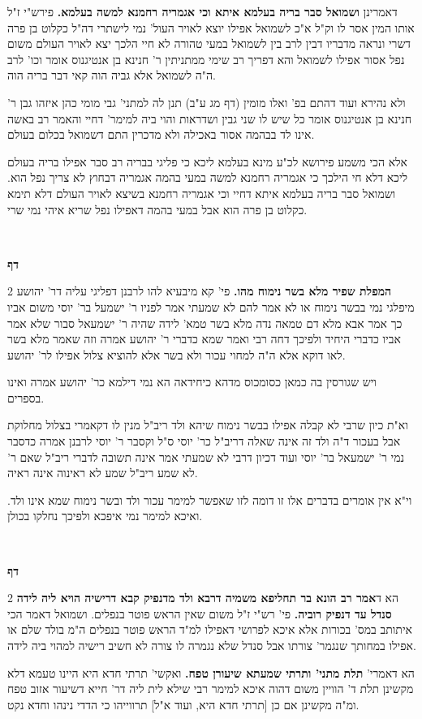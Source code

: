 \documentclass[12pt, openany]{book}
\newcommand{\sethebfont}{
\fontsize{10.5pt}{21.0pt} \selectfont
}
\newcommand{\twocol}[1]{
	{\sethebfont \begin{multicols}{2}
			#1
	\end{multicols}}	
}
\newcommand{\textblock}[1]{
{\sethebfont #1\\}	
}
\newcommand{\chapname}{}
\newcommand{\newchap}[1]{
	\addcontentsline{toc}{chapter}{#1}
	\renewcommand{\chapname}{#1}
		\begin{center}
			\textbf{%
\fontsize{16pt}{16pt}\selectfont
				#1}
		\end{center}
}
\begin{document}
{ דאמרינן \textbf{ושמואל סבר בריה בעלמא איתא וכי אגמריה רחמנא למשה בעלמא.}  פירש"י ז"ל אותו המין אסר לו וק"ל א"כ לשמואל אפילו יוצא לאויר העול' נמי לישתרי דה"ל כקלוט בן פרה דשרי ונראה מדבריו דבין לרב בין לשמואל במעי טהורה לא חיי הלכך יצא לאויר העולם משום נפל אסור אפילו לשמואל והא דפריך רב שימי ממתניתין ר' חנינא בן אנטיגנוס אומר וכו' לרב ה"ה לשמואל אלא גביה הוה קאי דבר בריה הוה.\par ולא נהירא ועוד דהתם בפ' ואלו מומין (דף מג ע"ב) תנן לה למתני' גבי מומי כהן איזהו גבן ר' חנינא בן אנטיגנוס אומר כל שיש לו שני גבין ושדראות והוי ביה למימר' דחיי והאמר רב באשה אינו לד בבהמה אסור באכילה ולא מדכרין התם דשמואל בכלום בעולם.\par  אלא הכי משמע פירושא לכ"ע מינא בעלמא ליכא כי פליגי בבריה רב סבר אפילו בריה בעולם ליכא דלא חי הילכך כי אגמריה רחמנא למשה במעי בהמה אגמריה דבחוץ לא צריך נפל הוא. ושמואל סבר בריה בעלמא איתא דחיי וכי אגמריה רחמנא בשיצא לאויר העולם דלא תימא כקלוט בן פרה הוא אבל במעי בהמה דאפילו נפל שריא איהי נמי שרי. 
\par}
\textblock{}{}
\newchap{דף }
\twocol{\textbf{המפלת שפיר מלא בשר נימוח מהו.}  פי' קא מיבעיא להו לרבנן דפליגי עליה דר' יהושע מיפלגי נמי בבשר נימוח או לא אמר להם לא שמעתי אמר לפניו ר' ישמעל בר' יוסי משום אביו כך אמר אבא מלא דם טמאה נדה מלא בשר טמא' לידה שהיה ר' ישמעאל סבור שלא אמר אביו כדברי היחיד ולפיכך דחה רבי ואמר שמא כדברי ר' יהושע אמרה וזה שאמר מלא בשר לאו דוקא אלא ה"ה למחוי עכור ולא בשר אלא להוציא צלול אפילו לר' יהושע.\par  ויש שגורסין בה כמאן כסומכוס מדהא כיחידאה הא נמי דילמא כר' יהושע אמרה ואינו בספרים.\par וא"ת כיון שרבי לא קבלה אפילו בבשר נימוח שיהא ולד ריב"ל מנין לו דקאמרי בצלול מחלוקת אבל בעכור ד"ה ולד זה אינה שאלה דריב"ל כר' יוסי ס"ל וקסבר ר' יוסי לרבנן אמרה כדסבר נמי ר' ישמעאל בר' יוסי ועוד דכיון דרבי לא שמעתי אמר אינה תשובה לדברי ריב"ל שאם ר' לא שמע ריב"ל שמע לא ראינוה אינה ראיה.\par  וי"א אין אומרים בדברים אלו זו דומה לזו שאפשר למימר עכור ולד ובשר נימוח שמא אינו ולד. ואיכא למימר נמי איפכא ולפיכך נחלקו בכולן. 
\par}
\textblock{}{}
\newchap{דף }
\twocol{הא ד\textbf{אמר רב הונא בר תחליפא משמיה דרבא ולד מדנפיק קבא דרישיה הויא ליה לידה סנדל עד דנפיק רוביה.}  פי' רש"י ז"ל משום שאין הראש פוטר בנפלים. ושמואל דאמר הכי איתותב במס' בכורות אלא איכא לפרושי דאפילו למ"ד הראש פוטר בנפלים ה"מ בולד שלם או אפילו במחותך שנגמר' צורתו אבל סנדל שלא נגמרה לו צורה לא חשיב רישיה למהוי ביה לידה. 
\par הא דאמרי' \textbf{תלת מתני' ותרתי שמעתא שיעורן טפח.}  ואקשי' תרתי חדא היא היינו טעמא דלא מקשינן תלת ד' הוויין משום דהוה איכא למימר רבי שילא לית ליה דר' חייא דשיעור אזוב טפח ומ"ה מקשינן אם כן [תרתי חדא היא, ועוד א"ל] תרווייהו כי הדדי נינהו וחדא נקט. 
\par}
\end{document}
